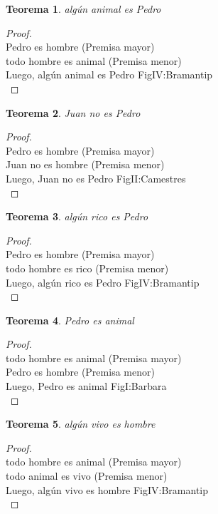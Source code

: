 ﻿\documentclass[12pt]{book}
\newtheorem{theorem}{Teorema}[chapter]
\newtheorem{proof}{Demostración}
\begin{document}
\begin{theorem}
algún animal es Pedro
\label{th: 12}
\end{theorem}\begin{proof}\\Pedro es hombre	 (Premisa mayor) \\todo hombre es animal	 (Premisa menor) \\Luego, algún animal es Pedro	FigIV:Bramantip \\ \end{proof}
\begin{theorem}
Juan no es Pedro
\label{th: 13}
\end{theorem}\begin{proof}\\Pedro es hombre	 (Premisa mayor) \\Juan no es hombre	 (Premisa menor) \\Luego, Juan no es Pedro	FigII:Camestres \\ \end{proof}
\begin{theorem}
algún rico es Pedro
\label{th: 14}
\end{theorem}\begin{proof}\\Pedro es hombre	 (Premisa mayor) \\todo hombre es rico	 (Premisa menor) \\Luego, algún rico es Pedro	FigIV:Bramantip \\ \end{proof}
\begin{theorem}
Pedro es animal
\label{th: 15}
\end{theorem}\begin{proof}\\todo hombre es animal	 (Premisa mayor) \\Pedro es hombre	 (Premisa menor) \\Luego, Pedro es animal	FigI:Barbara \\ \end{proof}
\begin{theorem}
algún vivo es hombre
\label{th: 16}
\end{theorem}\begin{proof}\\todo hombre es animal	 (Premisa mayor) \\todo animal es vivo	 (Premisa menor) \\Luego, algún vivo es hombre	FigIV:Bramantip \\ \end{proof}
\end{document}
